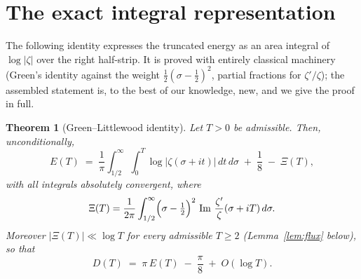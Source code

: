 \documentclass[11pt]{amsart}
\theoremstyle{plain}
\newtheorem{theorem}{Theorem}[section]
\theoremstyle{definition}
\theoremstyle{remark}
\newcommand{\Imm}{\operatorname{Im}}
\begin{document}
\section{The exact integral representation}\label{sec:green}

The following identity expresses the truncated energy as an area integral of $\log|\zeta|$ over the right half-strip. It is proved with entirely classical machinery (Green's identity against the weight $\tfrac12(\sigma-\tfrac12)^2$, partial fractions for $\zeta'/\zeta$); the assembled statement is, to the best of our knowledge, new, and we give the proof in full.

\begin{theorem}[Green--Littlewood identity]\label{thm:GL}
Let $T>0$ be admissible. Then, unconditionally,
\begin{equation}\label{eq:GL}
E(T)\;=\;\frac1\pi\int_{1/2}^{\infty}\!\!\int_0^T \log|\zeta(\sigma+it)|\,dt\,d\sigma\;+\;\frac18\;-\;\Xi(T),
\end{equation}
with all integrals absolutely convergent, where
\[
\Xi(T)=\frac{1}{2\pi}\int_{1/2}^\infty\Bigl(\sigma-\tfrac12\Bigr)^2\,\Imm\,\frac{\zeta'}{\zeta}(\sigma+iT)\,d\sigma .
\]
Moreover $|\Xi(T)|\ll\log T$ for \emph{every} admissible $T\ge2$ (Lemma~\ref{lem:flux} below), so that
\begin{equation}\label{eq:GLapprox}
D(T)\;=\;\pi\,E(T)\;-\;\frac\pi8\;+\;O(\log T).
\end{equation}
\end{theorem}
\end{document}
